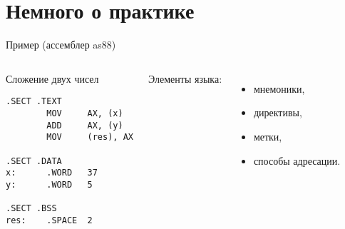\section {Немного о практике}

\begin{frame}[fragile]{Пример (ассемблер as88)}
\begin{columns}
	\column{7.5cm}
\begin{block}{Сложение двух чисел}
\begin{verbatim}
.SECT .TEXT
        MOV     AX, (x)
        ADD     AX, (y)
        MOV     (res), AX

.SECT .DATA
x:      .WORD   37
y:      .WORD   5

.SECT .BSS
res:    .SPACE  2
\end{verbatim}
\end{block}
	\column{4.5cm}\pause
Элементы языка:
\begin{itemize}
	\item мнемоники,
	\item директивы,
	\item метки,
	\item способы адресации.
\end{itemize}
\end{columns}
\end{frame}


